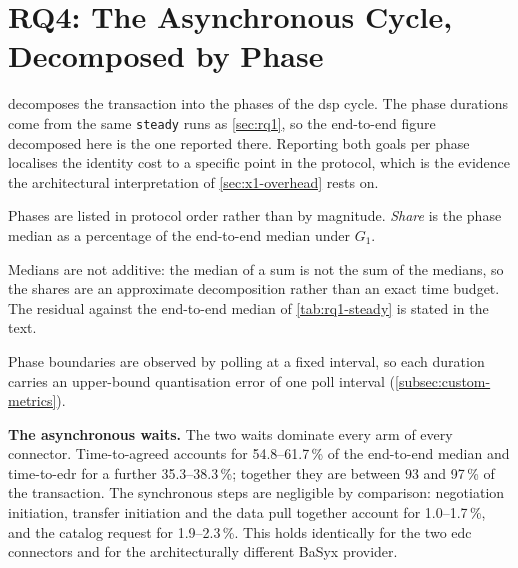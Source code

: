 \section{RQ4: The Asynchronous Cycle, Decomposed by Phase}\label{sec:rq4}


 decomposes the transaction into the phases of the \gls{dsp} cycle. The phase durations come from the same \texttt{steady} runs as \cref{sec:rq1}, so the end-to-end figure decomposed here is the one reported there. Reporting both goals per phase localises the identity cost to a specific point in the protocol, which is the evidence the architectural interpretation of \cref{sec:x1-overhead} rests on.

\begin{table}[H]
    \centering
    \begin{threeparttable}
    \small
    \setlength{\tabcolsep}{5pt}
    \small
    \setlength{\tabcolsep}{4pt}
    
    \begin{tablenotes}\footnotesize
        \item Phases are listed in protocol order rather than by magnitude. \emph{Share} is the phase median as a percentage of the end-to-end median under $G_1$.
        \item Medians are not additive: the median of a sum is not the sum of the medians, so the shares are an approximate decomposition rather than an exact time budget. The residual against the end-to-end median of \cref{tab:rq1-steady} is stated in the text.
        \item Phase boundaries are observed by polling at a fixed interval, so each duration carries an upper-bound quantisation error of one poll interval (\cref{subsec:custom-metrics}).
    \end{tablenotes}
    \end{threeparttable}
    \caption[Per-phase latency of the DSP transaction cycle]{Per-phase latency of the \gls{dsp} transaction cycle, by connector and identity goal.}
    \label{tab:rq4-phases}
\end{table}

\textbf{The asynchronous waits.} The two waits dominate every arm of every connector. Time-to-agreed accounts for 54.8--61.7\,\% of the end-to-end median and time-to-\gls{edr} for a further 35.3--38.3\,\%; together they are between 93 and 97\,\% of the transaction. The synchronous steps are negligible by comparison: negotiation initiation, transfer initiation and the data pull together account for 1.0--1.7\,\%, and the catalog request for 1.9--2.3\,\%. This holds identically for the two \gls{edc} connectors and for the architecturally different BaSyx provider.

